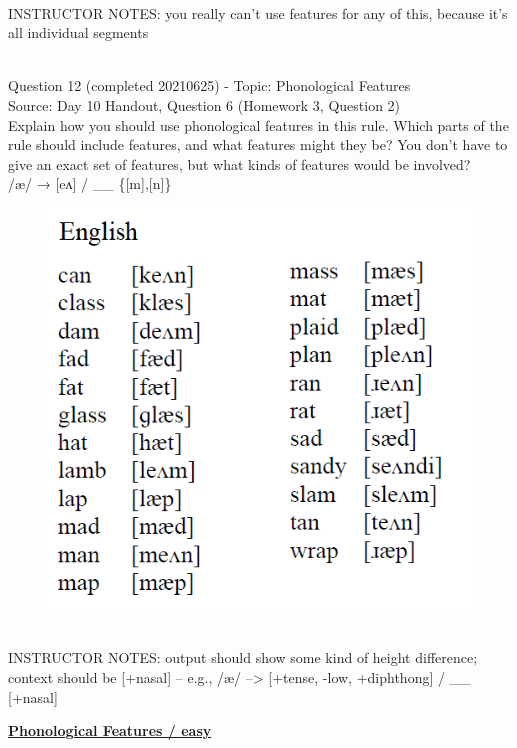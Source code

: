 \documentclass[12pt]{article}
\begin{document}
~\\
INSTRUCTOR NOTES: you really can't use features for any of this, because it's all individual segments


~\\

{\large Question 12} (completed 20210625) - Topic: Phonological Features\\
Source: Day 10 Handout, Question 6 (Homework 3, Question 2)\\

Explain how you should use phonological features in this rule. Which parts of the rule should include features, and what features might they be? You don't have to give an exact set of features, but what kinds of features would be involved?\\

/æ/ → {[eʌ]} / \_\_ \{{[m]},{[n]}\}

\begin{figure}[H]
\includegraphics{../images/english_aeraising.png}
\end{figure}

~\\
INSTRUCTOR NOTES: output should show some kind of height difference; context should be [+nasal] -- e.g., /æ/ --> [+tense, -low, +diphthong] / \_\_ [+nasal]


\newpage\textbf{\underline{\huge Phonological Features / easy\\}}
\end{document}
